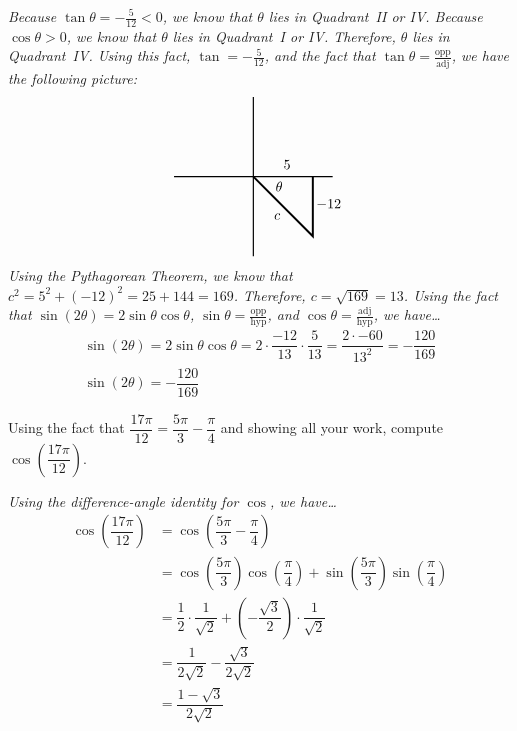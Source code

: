 \documentclass[12pt,letterpaper]{exam}
\begin{document}
\begin{questions}
\begin{enumerate}[(a)]
	{\itshape Because $\tan \theta= -\frac{5}{12} < 0$, we know that $\theta$ lies in Quadrant~II or IV. Because $\cos \theta > 0$, we know that $\theta$ lies in Quadrant~I or IV. Therefore, $\theta$ lies in Quadrant~IV. Using this fact, $\tan= -\frac{5}{12}$, and the fact that $\tan \theta= \frac{\text{opp}}{\text{adj}}$, we have the following picture:
		\[
		\begin{tikzpicture}
		\draw[line width=0.03cm] (-2,0) -- (2,0);
		\draw[line width=0.03cm] (0,-2) -- (0,2);
		\draw[line width=0.05cm] (0,0) -- (1.5,-1.5) -- (1.5,0);
		\node at (0.65,-0.25) {$\theta$};
		\node at (0.85,0.3) {$5$};
		\node at (1.9,-0.7) {$-12$};
		\node at (0.6,-1.0) {$c$};
		\end{tikzpicture}
		\]
	Using the Pythagorean Theorem, we know that $c^2= 5^2 + (-12)^2= 25 + 144= 169$. Therefore, $c= \sqrt{169}= 13$. Using the fact that $\sin(2\theta)= 2 \sin \theta \cos \theta$, $\sin \theta= \frac{\text{opp}}{\text{hyp}}$, and $\cos \theta= \frac{\text{adj}}{\text{hyp}}$, we have\dots
		\[
		\begin{gathered}
		\sin(2\theta)= 2 \sin \theta \cos \theta= 2 \cdot \dfrac{-12}{13} \cdot \dfrac{5}{13}= \dfrac{2 \cdot -60}{13^2}= -\dfrac{120}{169} \\[0.3cm]
		\boxed{\sin(2\theta)= -\dfrac{120}{169}}
		\end{gathered}
		\]
	}
	
	\end{enumerate}



\newpage
\question[10] Using the fact that $\dfrac{17\pi}{12}= \dfrac{5\pi}{3} - \dfrac{\pi}{4}$ and showing all your work, compute $\cos \left( \dfrac{17\pi}{12} \right)$. \pspace

{\itshape \tsol Using the difference-angle identity for $\cos$, we have\dots
	\[
	\begin{aligned}
	\cos \left( \dfrac{17\pi}{12} \right)&= \cos \left( \dfrac{5\pi}{3} - \dfrac{\pi}{4} \right) \\[0.3cm]
	&= \cos \left( \dfrac{5\pi}{3} \right) \cos \left( \dfrac{\pi}{4} \right) + \sin \left( \dfrac{5\pi}{3} \right) \sin \left( \dfrac{\pi}{4} \right) \\[0.3cm]
	&= \dfrac{1}{2} \cdot \dfrac{1}{\sqrt{2}} + \left( - \dfrac{\sqrt{3}}{2} \right) \cdot \dfrac{1}{\sqrt{2}} \\[0.3cm]
	&= \dfrac{1}{2 \sqrt{2}} - \dfrac{\sqrt{3}}{2 \sqrt{2}} \\[0.3cm]
	&= \dfrac{1 - \sqrt{3}}{2 \sqrt{2}}
	\end{aligned}
	\] \vfill

}
\end{questions}
\end{document}
